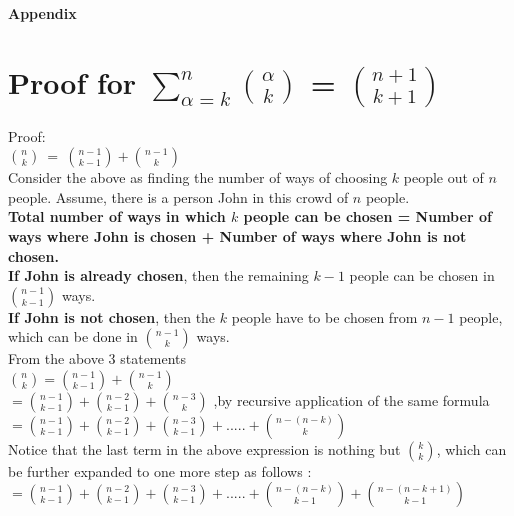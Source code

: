 \documentclass{llncs}
\begin{document}
\vspace{2cm}

\appendix
\begin{center}
\textbf{\huge{Appendix}}
\end{center}
\section{ Proof for $ \sum_{\alpha=k}^n \binom{\alpha}{k} $ = $ \binom {n+1}{k+1}$}
Proof:\\

$\binom{n}{k}\ =\ \binom{n-1}{k-1} + \binom{n-1}{k}$\\

Consider the above as finding the number of ways of choosing $k$ people out of $n$ people. Assume,  there is a person John in this crowd of $n$ people. \\

\textbf{Total number of ways in which $k$ people can be chosen = Number of ways where John is chosen + Number of ways where John is not chosen.} \\

\textbf{If John is already chosen}, then the remaining $k-1$ people can be chosen in $\binom {n-1}{k-1}$ ways. \\

\textbf{If John is not chosen}, then the $k$ people have to be chosen from $n-1$ people, which can be done in $\binom{n-1}{k}$ ways. \\

From the above 3 statements \\

$\binom{n}{k} = \binom{n-1}{k-1} + \binom{n-1}{k}$\\

$= \binom{n-1}{k-1} + \binom{n-2}{k-1} + \binom{n-3}{k}$  \hspace{1cm} ,by recursive application of the same formula\\

$= \binom{n-1}{k-1} + \binom{n-2}{k-1} + \binom{n-3}{k-1} + ..... + \binom{n-(n-k)}{k}$  \\

Notice that the last term in the above expression is nothing but $\binom{k}{k}$, which can be further expanded to one more step as follows : \\

$= \binom{n-1}{k-1} + \binom{n-2}{k-1} + \binom{n-3}{k-1} + ..... + \binom{n-(n-k)}{k-1} + \binom{n-(n-k+1)}{k-1}$  \\
\end{document}
